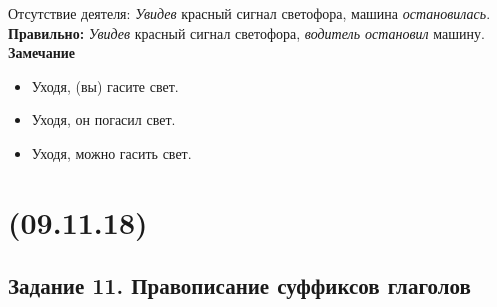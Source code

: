 \documentclass{article}
\begin{document}
\begin{enumerate}
\begin{itemize}
    Отсутствие деятеля: \emph{Увидев} красный сигнал светофора, машина \emph{остановилась}.\\
    \textbf{Правильно:} \emph{Увидев} красный сигнал светофора, \emph{водитель остановил} машину.\\
    \textbf{Замечание}
    \begin{itemize}
    \item
      Уходя, (вы) гасите свет.
    \item
      Уходя, он погасил свет.
    \item
      Уходя, можно гасить свет.
    \end{itemize}
  \end{itemize}
\end{enumerate}

\newpage
\noindent\makebox[\linewidth]{\rule{\paperwidth}{0.4pt}}
\section{(09.11.18)}
\noindent\makebox[\linewidth]{\rule{\paperwidth}{0.4pt}}

\subsection{Задание 11. Правописание суффиксов глаголов}
\end{document}
